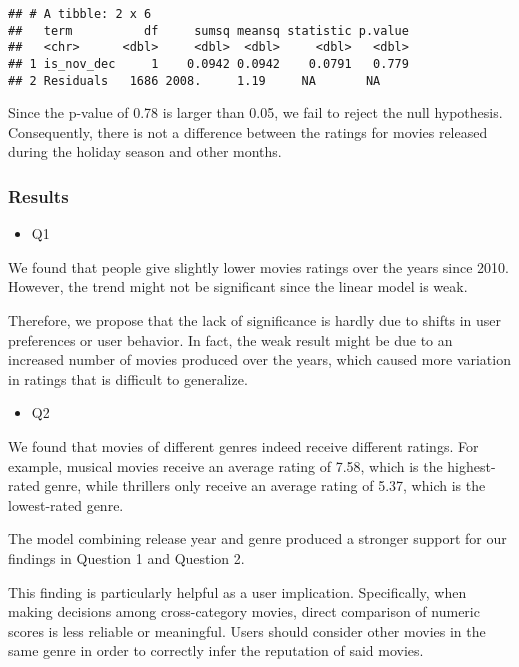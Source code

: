 \documentclass[
]{article}
\providecommand{\tightlist}{%
  \setlength{\itemsep}{0pt}\setlength{\parskip}{0pt}}
\begin{document}
\begin{verbatim}
## # A tibble: 2 x 6
##   term          df     sumsq meansq statistic p.value
##   <chr>      <dbl>     <dbl>  <dbl>     <dbl>   <dbl>
## 1 is_nov_dec     1    0.0942 0.0942    0.0791   0.779
## 2 Residuals   1686 2008.     1.19     NA       NA
\end{verbatim}

Since the p-value of 0.78 is larger than 0.05, we fail to reject the
null hypothesis. Consequently, there is not a difference between the
ratings for movies released during the holiday season and other months.

\hypertarget{results}{%
\subsubsection{Results}\label{results}}

\begin{itemize}
\tightlist
\item
  Q1
\end{itemize}

We found that people give slightly lower movies ratings over the years
since 2010. However, the trend might not be significant since the linear
model is weak.

Therefore, we propose that the lack of significance is hardly due to
shifts in user preferences or user behavior. In fact, the weak result
might be due to an increased number of movies produced over the years,
which caused more variation in ratings that is difficult to generalize.

\begin{itemize}
\tightlist
\item
  Q2
\end{itemize}

We found that movies of different genres indeed receive different
ratings. For example, musical movies receive an average rating of 7.58,
which is the highest-rated genre, while thrillers only receive an
average rating of 5.37, which is the lowest-rated genre.

The model combining release year and genre produced a stronger support
for our findings in Question 1 and Question 2.

This finding is particularly helpful as a user implication.
Specifically, when making decisions among cross-category movies, direct
comparison of numeric scores is less reliable or meaningful. Users
should consider other movies in the same genre in order to correctly
infer the reputation of said movies.
\end{document}
